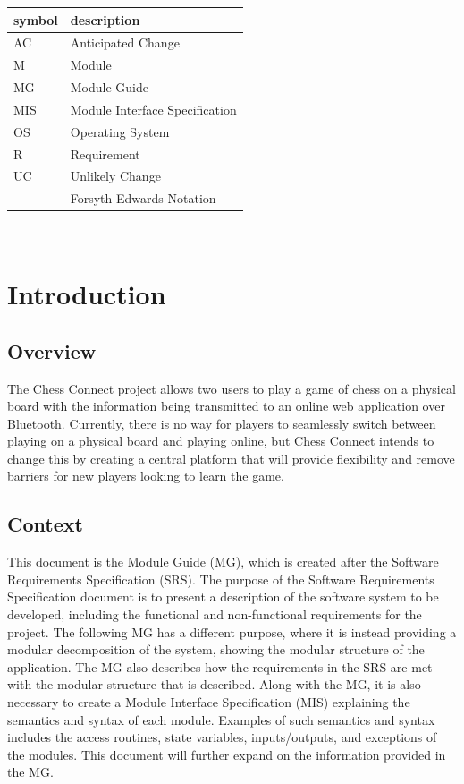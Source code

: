 \documentclass[12pt, titlepage]{article}
\begin{document}
\renewcommand{\arraystretch}{1.2}
\begin{tabular}{l l} 
  \toprule		
  \textbf{symbol} & \textbf{description}\\
  \midrule 
  AC & Anticipated Change\\
  M & Module \\
  MG & Module Guide \\
  MIS & Module Interface Specification \\
  OS & Operating System \\
  R & Requirement\\
  UC & Unlikely Change \\
  \cite{FEN} & Forsyth-Edwards Notation\\
  \bottomrule
\end{tabular}\\

\newpage

\tableofcontents

\listoftables

\listoffigures

\newpage


\section{Introduction}

\subsection{Overview}

The Chess Connect project allows two users to play a game of chess on a physical board with the information being transmitted to an online web application over Bluetooth.
Currently, there is no way for players to seamlessly switch between playing on a physical board and playing online, but Chess Connect intends to change this by creating a central platform that will provide flexibility and remove barriers for new players looking to learn the game.

\subsection{Context}

This document is the Module Guide (MG), which is created after the Software Requirements Specification (SRS). 
The purpose of the Software Requirements Specification document is to present a description of the software system to be developed, including the functional and non-functional requirements for the project. The following MG has a different purpose, where it is instead providing a modular decomposition of the system, showing the modular structure of the application. The MG also describes how the requirements in the SRS are met with the modular structure that is described.
Along with the MG, it is also necessary to create a Module Interface Specification (MIS) explaining the semantics and syntax of each module. Examples of such semantics and syntax includes the access routines, state variables, inputs/outputs, and exceptions of the modules. This document will further expand on the information provided in the MG.
\end{document}
